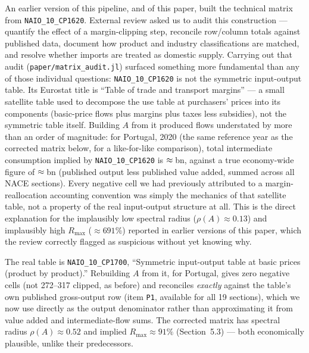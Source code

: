 \documentclass[11pt]{article}
\begin{document}
An earlier version of this pipeline, and of this paper, built the
technical matrix from \texttt{NAIO\_10\_CP1620}. External review asked us
to audit this construction --- quantify the effect of a margin-clipping
step, reconcile row/column totals against published data, document how
product and industry classifications are matched, and resolve whether
imports are treated as domestic supply. Carrying out that audit
(\texttt{paper/matrix\_audit.jl}) surfaced something more fundamental
than any of those individual questions: \texttt{NAIO\_10\_CP1620} is not
the symmetric input-output table. Its Eurostat title is ``Table of trade
and transport margins'' --- a small satellite table used to decompose the
use table at purchasers' prices into its components (basic-price flows
plus margins plus taxes less subsidies), not the symmetric table itself.
Building $A$ from it produced flows understated by more than an order of
magnitude: for Portugal, 2020 (the same reference year as the corrected
matrix below, for a like-for-like comparison), total intermediate
consumption implied by \texttt{NAIO\_10\_CP1620} is
$\approx\mkern1mu$\,bn, against a true economy-wide figure of
$\approx\mkern1mu$\,bn (published output less published
value added, summed across all NACE sections). Every negative cell we
had previously attributed to a margin-reallocation accounting convention
was simply the mechanics of that satellite table, not a property of the
real input-output structure at all. This is the direct explanation for
the implausibly low spectral radius ($\rho(A)\approx0.13$) and
implausibly high $R_{\max}$ ($\approx691\%$) reported in earlier
versions of this paper, which the review correctly flagged as suspicious
without yet knowing why.

The real table is \texttt{NAIO\_10\_CP1700}, ``Symmetric input-output
table at basic prices (product by product).'' Rebuilding $A$ from it,
for Portugal, gives zero negative cells (not 272--317 clipped, as
before) and reconciles \emph{exactly} against the table's own published
gross-output row (item \texttt{P1}, available for all 19 sections), which
we now use directly as the output denominator rather than approximating
it from value added and intermediate-flow sums. The corrected matrix has
spectral radius $\rho(A)\approx0.52$ and implied $R_{\max}\approx91\%$
(Section~5.3) --- both economically plausible, unlike their predecessors.
\end{document}
